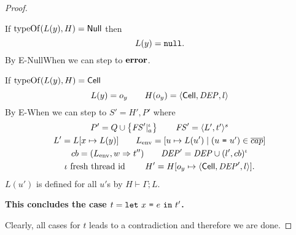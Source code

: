 \begin{proof}
\begin{description}
\begin{description}
          If $\mbox{$\mathrm{typeOf}$}(L(y), H) = \mbox{$\mathsf{Null}$}$ then
          \begin{equation*}
            L(y) = \mbox{\mdseries\texttt{null}}.
          \end{equation*}
          By {\sc E-NullWhen} we can step to $\mbox{{\bf error}}$. \contradiction

          If $\mbox{$\mathrm{typeOf}$}(L(y), H) = \mbox{$\mathsf{Cell}$}$
          \begin{equation*}
            L(y) = o_y  \quad\quad H(o_y) = \mbox{$\langle \mbox{$\mathsf{Cell}$}{}, \mathit{DEP}, l \rangle$}
          \end{equation*}
          By {\sc E-When} we can step to $S' = H', P'$ where
          \begin{equation*}
            \begin{gathered}
              P' = Q \cup \left\{\mathit{FS}'|_a^\iota \right\} \quad\quad \mathit{FS}' = \mbox{$\langle L',
              t' \rangle^s$} \\
              L' = L[x \mapsto L(y)] \quad\quad L_{\text{env}} = [u \mapsto L(u')
              \mid
              (\mbox{\mdseries$u$~\texttt{=}~$u'$}) \in \overline{cap}] \\
              cb = ( L_{\text{env}}, w \Rightarrow t'' ) \quad\quad \mathit{DEP}' = \mathit{DEP}
              \cup (l', cb)^\iota \\
              \iota \text{ fresh thread id } \quad\quad H' = H[o_y \mapsto \mbox{$\langle \mbox{$\mathsf{Cell}$}{}, \mathit{DEP}',
              l \rangle$}].
            \end{gathered}
          \end{equation*}
          $L(u')$ is defined for all $u'$s by $H \vdash \Gamma; L$. \contradiction
      \end{description}
      {\bf This concludes the case $t = \mbox{\mdseries\texttt{let}~$x$~\texttt{=}~$e$~\texttt{in}~$t'$}$.}
  \end{description}
  Clearly, all cases for $t$ leads to a contradiction and therefore we are done.
\end{proof}


